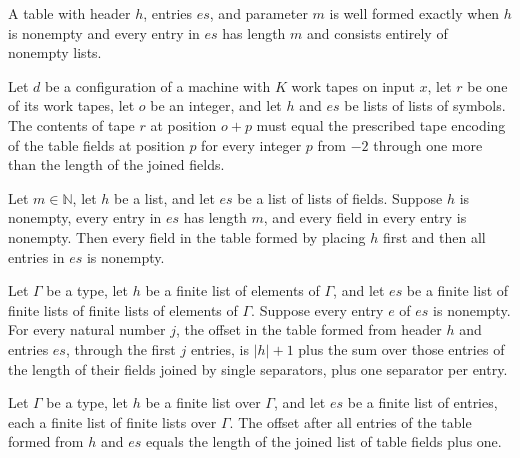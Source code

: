 \begin{definition}
\label{Turing.TableWF}
\leanok
A table with header $h$, entries $es$, and parameter $m$ is well formed exactly when $h$
is nonempty and every entry in $es$ has length $m$ and consists entirely of nonempty
lists.
\end{definition}

\begin{definition}
\label{Turing.TableAt}
\leanok
{}
Let $d$ be a configuration of a machine with $K$ work tapes on input $x$, let $r$ be one
of its work tapes, let $o$ be an integer, and let $h$ and $es$ be lists of lists of
symbols. The contents of tape $r$ at position $o+p$ must equal the prescribed tape
encoding of the table fields at position $p$ for every integer $p$ from $-2$ through one
more than the length of the joined fields.
\end{definition}

\begin{theorem}
\label{Turing.TableWF.field_ne_nil}
\leanok
{}
Let $m\in\mathbb{N}$, let $h$ be a list, and let $es$ be a list of lists of fields.
Suppose $h$ is nonempty, every entry in $es$ has length $m$, and every field in every
entry is nonempty. Then every field in the table formed by placing $h$ first and then
all entries in $es$ is nonempty.
\end{theorem}

\begin{theorem}
\label{Turing.tableOffset_eq}
\leanok
{}
Let $\Gamma$ be a type, let $h$ be a finite list of elements of $\Gamma$, and let $es$
be a finite list of finite lists of finite lists of elements of $\Gamma$. Suppose every
entry $e$ of $es$ is nonempty. For every natural number $j$, the offset in the table
formed from header $h$ and entries $es$, through the first $j$ entries, is $|h|+1$ plus
the sum over those entries of the length of their fields joined by single separators,
plus one separator per entry.
\end{theorem}

\begin{theorem}
\label{Turing.tableOffset_length}
\leanok
{}
Let $\Gamma$ be a type, let $h$ be a finite list over $\Gamma$, and let $es$ be a finite
list of entries, each a finite list of finite lists over $\Gamma$. The offset after all
entries of the table formed from $h$ and $es$ equals the length of the joined list of
table fields plus one.
\end{theorem}


